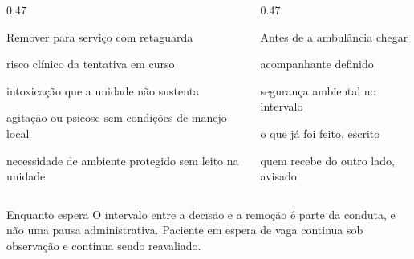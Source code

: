 \begin{frame}{}
\begin{columns}[onlytextwidth, t]
\begin{column}{0.47\textwidth}
\begin{caixaagir}{Remover para servi\c{c}o com retaguarda}
\begin{itemc}
\item risco cl\'inico da tentativa em curso
\item intoxica\c{c}\~ao que a unidade n\~ao sustenta
\item agita\c{c}\~ao ou psicose sem condi\c{c}\~oes de manejo local
\item necessidade de ambiente protegido sem leito na unidade
\end{itemc}
\end{caixaagir}
\end{column}
\calha
\begin{column}{0.47\textwidth}
\begin{caixaproteger}{Antes de a ambul\^ancia chegar}
\begin{itemc}
\item acompanhante definido
\item seguran\c{c}a ambiental no intervalo
\item o que j\'a foi feito, escrito
\item quem recebe do outro lado, avisado
\end{itemc}
\end{caixaproteger}
\end{column}
\end{columns}

\CRvg
\begin{caixaagir}{Enquanto espera}
O intervalo entre a decis\~ao e a remo\c{c}\~ao \'e parte da conduta, e n\~ao
uma pausa administrativa. Paciente em espera de vaga continua sob
observa\c{c}\~ao e continua sendo reavaliado.
\end{caixaagir}
\end{frame}

